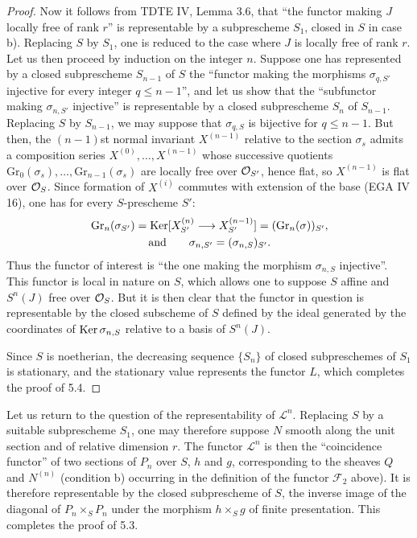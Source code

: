 \begin{proof}
Now it follows from TDTE IV, Lemma 3.6, that ``the functor making $J$ locally free of rank $r$'' is representable by a subprescheme $S_1$, closed in $S$ in case b). Replacing $S$ by $S_1$, one is reduced to the case where $J$ is locally free of rank $r$. Let us then proceed by induction on the integer $n$. Suppose one has represented by a closed subprescheme $S_{n-1}$ of $S$ the ``functor making the morphisms $\sigma_{q,S'}$ injective for every integer $q\leq n-1$'', and let us show that the ``subfunctor making $\sigma_{n,S'}$ injective'' is representable by a closed subprescheme $S_n$ of $S_{n-1}$. Replacing $S$ by $S_{n-1}$, we may suppose that $\sigma_{q,S}$ is bijective for $q\leq n-1$. But then, the $(n-1)$st normal invariant $X^{(n-1)}$ relative to the section $\sigma_s$ admits a composition series $X^{(0)},\ldots,X^{(n-1)}$ whose successive quotients $\mathrm{Gr}_0(\sigma_s),\ldots,\mathrm{Gr}_{n-1}(\sigma_s)$ are locally free over $\mathcal{O}_{S'}$, hence flat, so $X^{(n-1)}$ is flat over $\mathcal{O}_S$. Since formation of $X^{(i)}$ commutes with extension of the base (EGA IV 16), one has for every $S$-prescheme $S'$:
\[
\begin{gathered}
\mathrm{Gr}_n(\sigma_{S'})=\operatorname{Ker}[X_{S'}^{(n)}\longrightarrow X_{S'}^{(n-1)}]=(\mathrm{Gr}_n(\sigma))_{S'},\\
\text{and}\qquad\sigma_{n,S'}=(\sigma_{n,S})_{S'}.
\end{gathered}
\]
Thus the functor of interest is ``the one making the morphism $\sigma_{n,S}$ injective''. This functor is local in nature on $S$, which allows one to suppose $S$ affine and $S^n(J)$ free over $\mathcal{O}_S$. But it is then clear that the functor in question is representable by the closed subscheme of $S$ defined by the ideal generated by the coordinates of $\operatorname{Ker}\sigma_{n,S}$ relative to a basis of $S^n(J)$.

Since $S$ is noetherian, the decreasing sequence $\{S_n\}$ of closed subpreschemes of $S_1$ is stationary, and the stationary value represents the functor $L$, which completes the proof of 5.4.
\end{proof}

Let us return to the question of the representability of $\mathscr L^n$. Replacing $S$ by a suitable subprescheme $S_1$, one may therefore suppose $N$ smooth along the unit section and of relative dimension $r$. The functor $\mathscr L^n$ is then the ``coincidence functor'' of two sections of $P_n$ over $S$, $h$ and $g$, corresponding to the sheaves $Q$ and $N^{(n)}$ (condition b) occurring in the definition of the functor $\mathscr F_2$ above). It is therefore representable by the closed subprescheme of $S$, the inverse image of the diagonal of $P_n\times_S P_n$ under the morphism $h\times_S g$ of finite presentation. This completes the proof of 5.3.

